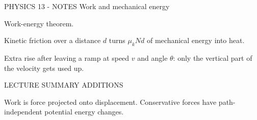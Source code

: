 PHYSICS 13 - NOTES
Work and mechanical energy

Work-energy theorem.

Kinetic friction over a distance \(d\) turns \(\mu_k N d\) of mechanical energy into heat.

Extra rise after leaving a ramp at speed \(v\) and angle \(\theta\): only the vertical part of the velocity gets used up.

LECTURE SUMMARY ADDITIONS

Work is force projected onto displacement. Conservative forces have path-independent potential energy changes.
